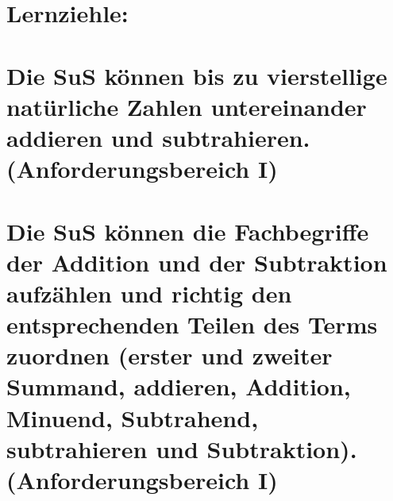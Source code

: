 \section*{Lernziehle:}

\section*{Die SuS können bis zu vierstellige natürliche Zahlen untereinander addieren und subtrahieren.(Anforderungsbereich I)}


\section*{Die SuS können die Fachbegriffe der Addition und der Subtraktion aufzählen und richtig den entsprechenden Teilen des Terms zuordnen (erster und zweiter Summand, addieren, Addition, Minuend, Subtrahend, subtrahieren und Subtraktion).(Anforderungsbereich I)}